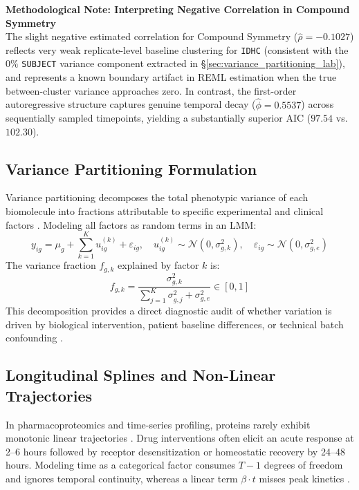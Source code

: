 \documentclass[11pt,twoside,openright]{book}
\begin{document}
\begin{notebox}
\textbf{Methodological Note: Interpreting Negative Correlation in Compound Symmetry}\\
The slight negative estimated correlation for Compound Symmetry ($\hat{\rho} = -0.1027$) reflects very weak replicate-level baseline clustering for \texttt{IDHC} (consistent with the $0\%$ \texttt{SUBJECT} variance component extracted in §\ref{sec:variance_partitioning_lab}), and represents a known boundary artifact in REML estimation when the true between-cluster variance approaches zero. In contrast, the first-order autoregressive structure captures genuine temporal decay ($\hat{\phi} = 0.5537$) across sequentially sampled timepoints, yielding a substantially superior AIC ($97.54$ vs. $102.30$).
\end{notebox}

\subsection{Variance Partitioning Formulation}

Variance partitioning decomposes the total phenotypic variance of each biomolecule into fractions attributable to specific experimental and clinical factors \cite{hoffman2016variancepartition}. Modeling all factors as random terms in an LMM:
\begin{equation}
\label{eq:varpart_model}
y_{ig} = \mu_g + \sum_{k=1}^K u_{ig}^{(k)} + \varepsilon_{ig}, \quad u_{ig}^{(k)} \sim \mathcal{N}(0, \sigma_{g, k}^2), \quad \varepsilon_{ig} \sim \mathcal{N}(0, \sigma_{g, e}^2)
\end{equation}
The variance fraction $f_{g, k}$ explained by factor $k$ is:
\begin{equation}
\label{eq:varpart_fraction}
f_{g, k} = \frac{\sigma_{g, k}^2}{\sum_{j=1}^K \sigma_{g, j}^2 + \sigma_{g, e}^2} \in [0, 1]
\end{equation}
This decomposition provides a direct diagnostic audit of whether variation is driven by biological intervention, patient baseline differences, or technical batch confounding \cite{hoffman2016variancepartition}.

\subsection{Longitudinal Splines and Non-Linear Trajectories}

In pharmacoproteomics and time-series profiling, proteins rarely exhibit monotonic linear trajectories \cite{wood2017generalized}. Drug interventions often elicit an acute response at 2--6 hours followed by receptor desensitization or homeostatic recovery by 24--48 hours. Modeling time as a categorical factor consumes $T - 1$ degrees of freedom and ignores temporal continuity, whereas a linear term $\beta \cdot t$ misses peak kinetics \cite{hastie1990generalized}.
\end{document}
